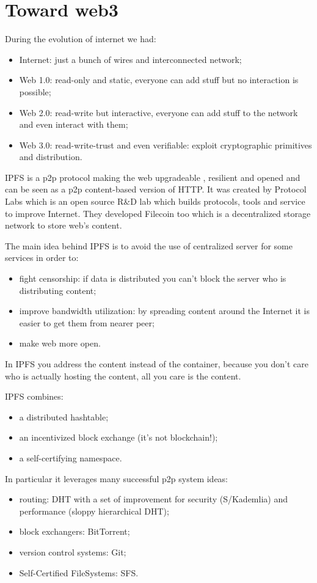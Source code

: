 \section{Toward web3}
During the evolution of internet we had:
\begin{itemize}
    \item Internet: just a bunch of wires and interconnected network;
    \item Web 1.0: read-only and static, everyone can add stuff but no interaction is possible;
    \item Web 2.0: read-write but interactive, everyone can add stuff to the network and even interact with them;
    \item Web 3.0: read-write-trust and even verifiable: exploit cryptographic primitives and distribution.
\end{itemize}

IPFS is a p2p protocol making the web upgradeable , resilient and opened and can be seen as a p2p content-based version of HTTP.
It was created by Protocol Labs which is an open source R\&D lab which builds protocols, tools and service to improve Internet.
They developed Filecoin too which is a decentralized storage network to store web's content.

The main idea behind IPFS is to avoid the use of centralized server for some services in order to:
\begin{itemize}
    \item fight censorship: if data is distributed you can't block the server who is distributing content;
    \item improve bandwidth utilization: by spreading content around the Internet it is easier to get them from nearer peer;
    \item make web more open.
\end{itemize}

In IPFS you address the content instead of the container, because you don't care who is actually hosting the content, all you care is the content.

IPFS combines:
\begin{itemize}
    \item a distributed hashtable;
    \item an incentivized block exchange (it's not blockchain!);
    \item a self-certifying namespace.
\end{itemize}
In particular it leverages many successful p2p system ideas:
\begin{itemize}
    \item routing: DHT with a set of improvement for security (S/Kademlia) and performance (sloppy hierarchical DHT);
    \item block exchangers: BitTorrent;
    \item version control systems: Git;
    \item Self-Certified FileSystems: SFS.
\end{itemize}

